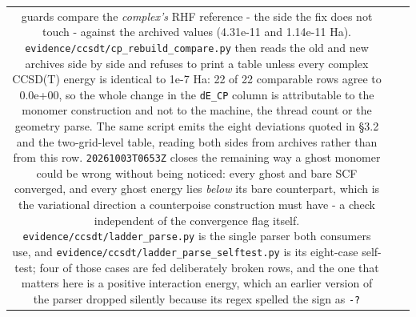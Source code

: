 \documentclass[11pt]{article}
\begin{document}
\begin{longtable}{c>{\raggedright\arraybackslash}p{}>{\raggedright\arraybackslash}p{}}
guards compare the \emph{complex's} RHF reference - the side the fix does not touch - against the archived values (4.31e-11 and 1.14e-11 Ha). \texttt{evidence/\allowbreak{}ccsdt/\allowbreak{}cp\_\allowbreak{}rebuild\_\allowbreak{}compare.py} then reads the old and new archives side by side and refuses to print a table unless every complex CCSD(T) energy is identical to 1e-7 Ha: 22 of 22 comparable rows agree to 0.0e+00, so the whole change in the \texttt{dE\_CP} column is attributable to the monomer construction and not to the machine, the thread count or the geometry parse. The same script emits the eight deviations quoted in \S{}3.2 and the two-grid-level table, reading both sides from archives rather than from this row. \texttt{20261003T0653Z} closes the remaining way a ghost monomer could be wrong without being noticed: every ghost and bare SCF converged, and every ghost energy lies \emph{below} its bare counterpart, which is the variational direction a counterpoise construction must have - a check independent of the convergence flag itself. \texttt{evidence/\allowbreak{}ccsdt/\allowbreak{}ladder\_\allowbreak{}parse.py} is the single parser both consumers use, and \texttt{evidence/\allowbreak{}ccsdt/\allowbreak{}ladder\_\allowbreak{}parse\_\allowbreak{}selftest.py} is its eight-case self-test; four of those cases are fed deliberately broken rows, and the one that matters here is a positive interaction energy, which an earlier version of the parser dropped silently because its regex spelled the sign as \texttt{-?} \\

\end{longtable}
\end{document}
